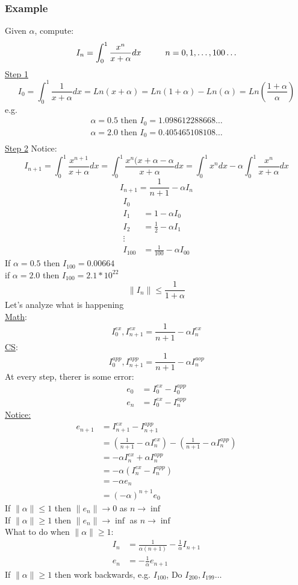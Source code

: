 \documentclass[10pt,usletter]{article}
\newcommand{\NP}{\newpage \vspace*{-0.4in}}
\newcommand{\tab}[1][1cm]{\hspace*{#1}}
\begin{document}
\subsubsection{Example}
Given $\alpha$, compute: $$I_n=\int_0^1\frac{x^n}{x+\alpha}dx \tab n=0,1,\hdots,100\hdots$$
\underline{Step 1} $$I_0=\int_0^1 \frac{1}{x+\alpha}dx=Ln(x+\alpha)=Ln(1+\alpha)-Ln(\alpha)=Ln\left(\frac{1+\alpha}{\alpha}\right)$$
e.g.
\begin{align*}
\alpha = 0.5 \text{ then } I_0=1.098612288668\hdots\\
\alpha = 2.0 \text{ then } I_0=0.405465108108\hdots\\
\end{align*}
\underline{Step 2} \tab Notice: $$I_{n+1}=\int_0^1\frac{x^{n+1}}{x+\alpha}dx=\int_0^1\frac{x^n(x+\alpha-\alpha}{x+\alpha}dx=\int_0^1x^ndx-\alpha\int_0^1\frac{x^n}{x+\alpha}dx$$
$$I_{n+1}=\frac{1}{n+1}-\alpha I_n$$
\begin{align*}
I_0&\\
I_1 &= 1-\alpha I_0\\
I_2 &= \frac{1}{2} - \alpha I_1\\
\vdots\\
I_{100} &= \frac{1}{100} - \alpha I_00
\end{align*}
If $\alpha = 0.5$ then $I_{100} = 0.00664$\\
if $\alpha = 2.0$ then $I_{100} = 2.1 * 10^{22}$\\
$$\|I_n\| \leq \frac{1}{1+\alpha}$$
Let's analyze what is happening \\
\underline{Math}: $$I_0^{ex}, I_{n+1}^{ex}=\frac{1}{n+1}-\alpha I_n^{ex}$$ 
\underline{CS}:	$$I_0^{app}, I_{n+1}^{app}=\frac{1}{n+1}-\alpha I_n^{aop}$$
At every step, therer is some error:
\begin{align*}
e_0&=I_0^{ex}-I_0^{app} \\
e_n&=I_0^{ex}-I_n^{app}
\end{align*}
\underline{Notice:} 
\begin{align*}
e_{n+1}&=I_{n+1}^{ex}-I_{n+1}^{app} \\
&=\left(\frac{1}{n+1}-\alpha I_n^{ex}\right)-\left(\frac{1}{n+1}-\alpha I_n^{app}\right) \\
&=-\alpha I_n^{ex}+\alpha I_n^{app} \\
&=-\alpha \left(I_n^{ex}-I_n^{app}\right) \\
&=-\alpha e_n \\
&=(-\alpha)^{n+1}e_0
\end{align*}
If $\|\alpha\|\le 1$ then $\|e_n\|\rightarrow 0$ as $n\rightarrow \inf$\\
If $\|\alpha\|\ge 1$ then $\|e_n\|\rightarrow \inf$ as $n\rightarrow \inf$\\
What to do when $\|\alpha\| \ge 1$:
\begin{align*}
I_n&=\frac{1}{\alpha (n+1)} - \frac{1}{\alpha} I_{n+1}\\
e_n&=-\frac{1}{\alpha}e_{n+1}
\end{align*}
If $\|\alpha\| \ge 1$ then work backwards, e.g. $I_{100}$, Do $I_{200}, I_{199}\hdots$
\NP
\end{document}
